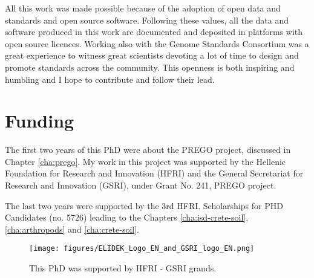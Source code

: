 \documentclass[
11pt, %
english, %
singlespacing, %
liststotoc, %
toctotoc, %
headsepline, %
]{MastersDoctoralThesis} %
\begin{document}
All this work was made possible because of the adoption of open data and standards
and open source software. Following these values, all the data and software produced
in this work are documented and deposited in platforms with open source licences. 
Working also with the Genome Standards Consortium was a great experience to witness
great scientists devoting a lot of time to design and promote standards across the 
community. This openness is both inspiring and humbling and I hope to contribute and follow 
their lead.

\chapter*{Funding}

The first two years of this PhD were about the PREGO project, discussed in Chapter \ref{cha:prego}. My work in this 
project was supported by the Hellenic Foundation for Research and
Innovation (HFRI) and the General Secretariat for Research and Innovation (GSRI),
under Grant No. 241, PREGO project.

The last two years were supported by the 3rd HFRI. Scholarships for PHD
Candidates (no. 5726) leading to the Chapters \ref{cha:isd-crete-soil}, \ref{cha:arthropods} and \ref{cha:crete-soil}.

   \begin{figure}[h]
      \centering
      \texttt{[image: figures/ELIDEK\_Logo\_EN\_and\_GSRI\_logo\_EN.png]}
      \caption[HFRI and GSRI funding]{
          This PhD was supported by HFRI - GSRI grands. 
      }
      \label{fig:hfri_logo}
   \end{figure}



\tableofcontents %

\listoffigures %

\listoftables %

\end{document}
